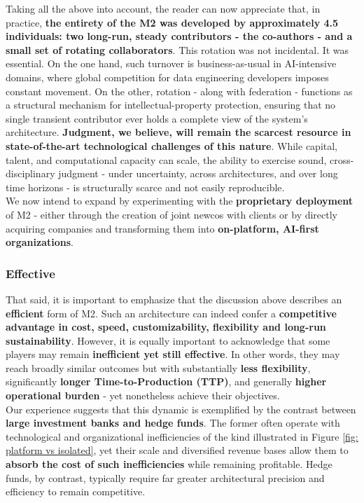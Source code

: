 \documentclass{article}
\begin{document}
Taking all the above into account, the reader can now appreciate that, in practice, \textbf{the entirety of the M2 was developed by approximately 4.5 individuals: two long-run, steady contributors - the co-authors - and a small set of rotating collaborators}. This rotation was not incidental. It was essential. On the one hand, such turnover is business-as-usual in AI-intensive domains, where global competition for data engineering developers imposes constant movement. On the other, rotation - along with federation - functions as a structural mechanism for intellectual-property protection, ensuring that no single transient contributor ever holds a complete view of the system’s architecture. \textbf{Judgment, we believe, will remain the scarcest resource in state-of-the-art technological challenges of this nature}. While capital, talent, and computational capacity can scale, the ability to exercise sound, cross-disciplinary judgment - under uncertainty, across architectures, and over long time horizons - is structurally scarce and not easily reproducible.\\

We now intend to expand by experimenting with the \textbf{proprietary deployment} of M2 - either through the creation of joint newcos with clients or by directly acquiring companies and transforming them into \textbf{on-platform, AI-first organizations}.\\

\subsubsection{Effective}
\label{subsubsection: Effective}
That said, it is important to emphasize that the discussion above describes an \textbf{efficient} form of M2. Such an architecture can indeed confer a \textbf{competitive advantage in cost, speed, customizability, flexibility and long-run sustainability}. However, it is equally important to acknowledge that some players may remain \textbf{inefficient yet still effective}. In other words, they may reach broadly similar outcomes but with substantially \textbf{less flexibility}, significantly \textbf{longer Time-to-Production (TTP)}, and generally \textbf{higher operational burden} - yet nonetheless achieve their objectives.\\

Our experience suggests that this dynamic is exemplified by the contrast between \textbf{large investment banks and hedge funds}. The former often operate with technological and organizational inefficiencies of the kind illustrated in Figure \ref{fig: platform vs isolated}, yet their scale and diversified revenue bases allow them to \textbf{absorb the cost of such inefficiencies} while remaining profitable. Hedge funds, by contrast, typically require far greater architectural precision and efficiency to remain competitive.\\
\end{document}

